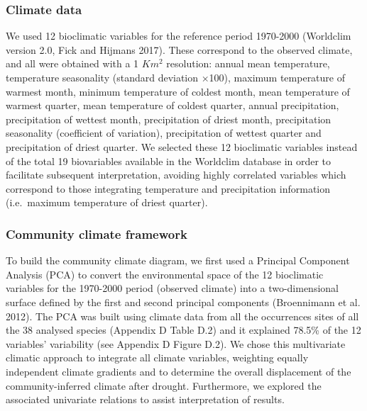 \documentclass[11pt,twoside]{reedthesis}
\begin{document}
\subsubsection{Climate data}\label{climate-data}

We used 12 bioclimatic variables for the reference period 1970-2000
(Worldclim version 2.0, Fick and Hijmans 2017). These correspond to the
observed climate, and all were obtained with a 1 \(Km^2\) resolution:
annual mean temperature, temperature seasonality (standard deviation
×100), maximum temperature of warmest month, minimum temperature of
coldest month, mean temperature of warmest quarter, mean temperature of
coldest quarter, annual precipitation, precipitation of wettest month,
precipitation of driest month, precipitation seasonality (coefficient of
variation), precipitation of wettest quarter and precipitation of driest
quarter. We selected these 12 bioclimatic variables instead of the total
19 biovariables available in the Worldclim database in order to
facilitate subsequent interpretation, avoiding highly correlated
variables which correspond to those integrating temperature and
precipitation information (i.e.~maximum temperature of driest
quarter).\par

\subsubsection{Community climate
framework}\label{community-climate-framework}

To build the community climate diagram, we first used a Principal
Component Analysis (PCA) to convert the environmental space of the 12
bioclimatic variables for the 1970-2000 period (observed climate) into a
two-dimensional surface defined by the first and second principal
components (Broennimann et al. 2012). The PCA was built using climate
data from all the occurrences sites of all the 38 analysed species
(Appendix D Table D.2) and it explained 78.5\% of the 12 variables'
variability (see Appendix D Figure D.2). We chose this multivariate
climatic approach to integrate all climate variables, weighting equally
independent climate gradients and to determine the overall displacement
of the community-inferred climate after drought. Furthermore, we
explored the associated univariate relations to assist interpretation of
results.\par
\end{document}
